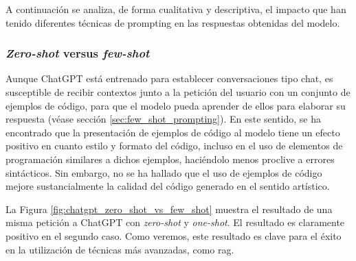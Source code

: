 A continuación se analiza, de forma cualitativa y descriptiva, el impacto que han tenido diferentes técnicas de {prompting} en las respuestas obtenidas del modelo.

\subsubsection{\emph{Zero-shot} versus \emph{few-shot}}

Aunque ChatGPT está entrenado para establecer conversaciones tipo chat, es susceptible de recibir contextos junto a la petición del usuario con un conjunto de ejemplos de código, para que el modelo pueda aprender de ellos para elaborar su respuesta (véase sección \ref{sec:few_shot_prompting}). En este sentido, se ha encontrado que la presentación de ejemplos de código al modelo tiene un efecto positivo en cuanto estilo y formato del código, incluso en el uso de elementos de programación similares a dichos ejemplos, haciéndolo menos proclive a errores sintácticos. Sin embargo, no se ha hallado que el uso de ejemplos de código mejore sustancialmente la calidad del código generado en el sentido artístico. 

La Figura \ref{fig:chatgpt_zero_shot_vs_few_shot} muestra el resultado de una misma petición a ChatGPT con \emph{zero-shot} y \emph{one-shot}. El resultado es claramente positivo en el segundo caso. Como veremos, este resultado es clave para el éxito en la utilización de técnicas más avanzadas, como \gls{rag}.



